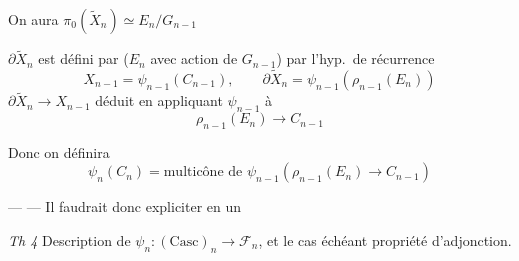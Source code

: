\documentclass[11pt,a4paper]{article}
\begin{document}
On aura $\pi_0(\widetilde{X}_n) \simeq E_n / G_{n-1}$

$\partial\widetilde{X}_n$ est défini par \struck{\ill{}} ($E_n$ avec action
de $G_{n-1}$) par l'hyp.\ de récurrence
\[
  X_{n-1} = \psi_{n-1}(C_{n-1}), \qquad \partial\widetilde{X}_n =
  \psi_{n-1}(\rho_{n-1}(E_n))
\]
$\partial\widetilde{X}_n \to X_{n-1}$ déduit en appliquant $\psi_{n-1}$ à
\[
  \rho_{n-1}(E_n) \longrightarrow C_{n-1}
\]

Donc on définira
\[
  \psi_n(C_n) = \text{multicône de } \psi_{n-1}(\rho_{n-1}(E_n) \to C_{n-1})
\]

--- --- Il faudrait donc expliciter en un

\emph{Th 4} Description de $\psi_n : (\mathrm{Casc})_n \to \mathcal{F}_n$,
et le cas échéant propriété d'adjonction.
\end{document}
